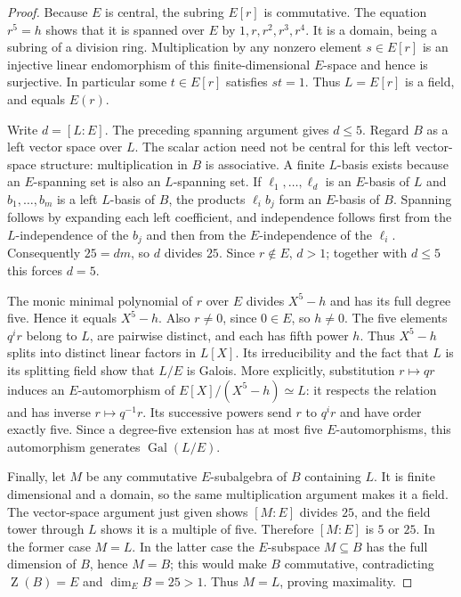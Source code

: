 \documentclass[11pt,letterpaper]{article}
\theoremstyle{definition}
\theoremstyle{remark}
\newcommand{\Gal}{\operatorname{Gal}}
\newcommand{\Cent}{\operatorname{Z}}
\begin{document}
\begin{proof}
Because $E$ is central, the subring $E[r]$ is commutative. The equation
$r^5=h$ shows that it is spanned over $E$ by $1,r,r^2,r^3,r^4$.
It is a domain, being a subring of a division ring. Multiplication by any
nonzero element $s\in E[r]$ is an injective linear endomorphism of this
finite-dimensional $E$-space and hence is surjective. In particular some
$t\in E[r]$ satisfies $st=1$. Thus $L=E[r]$ is a field, and equals $E(r)$.

Write $d=[L:E]$. The preceding spanning argument gives $d\leq5$.
Regard $B$ as a left vector space over $L$. The scalar action need not be
central for this left vector-space structure: multiplication in $B$ is
associative. A finite $L$-basis exists because an $E$-spanning set is also
an $L$-spanning set. If $\ell_1,\ldots,\ell_d$ is an $E$-basis of $L$
and $b_1,\ldots,b_m$ is a left $L$-basis of $B$, the products
$\ell_i b_j$ form an $E$-basis of $B$. Spanning follows by expanding each
left coefficient, and independence follows first from the $L$-independence
of the $b_j$ and then from the $E$-independence of the $\ell_i$.
Consequently $25=dm$, so $d$ divides $25$. Since $r\notin E$, $d>1$;
together with $d\leq5$ this forces $d=5$.

The monic minimal polynomial of $r$ over $E$ divides $X^5-h$ and has
its full degree five. Hence it equals $X^5-h$. Also $r\ne0$, since
$0\in E$, so $h\ne0$. The five elements $q^i r$ belong to $L$, are
pairwise distinct, and each has fifth power $h$. Thus $X^5-h$ splits
into distinct linear factors in $L[X]$. Its irreducibility and the fact
that $L$ is its splitting field show that $L/E$ is Galois. More explicitly,
substitution $r\mapsto qr$ induces an $E$-automorphism of
$E[X]/(X^5-h)\simeq L$: it respects the relation and has inverse
$r\mapsto q^{-1}r$. Its successive powers send $r$ to $q^i r$ and have
order exactly five. Since a degree-five extension has at most five
$E$-automorphisms, this automorphism generates $\Gal(L/E)$.

Finally, let $M$ be any commutative $E$-subalgebra of $B$ containing $L$.
It is finite dimensional and a domain, so the same multiplication argument
makes it a field. The vector-space argument just given shows $[M:E]$
divides $25$, and the field tower through $L$ shows it is a multiple of
five. Therefore $[M:E]$ is $5$ or $25$. In the former case $M=L$.
In the latter case the $E$-subspace $M\subseteq B$ has the full dimension
of $B$, hence $M=B$; this would make $B$ commutative, contradicting
$\Cent(B)=E$ and $\dim_E B=25>1$. Thus $M=L$, proving maximality.
\end{proof}
\end{document}
